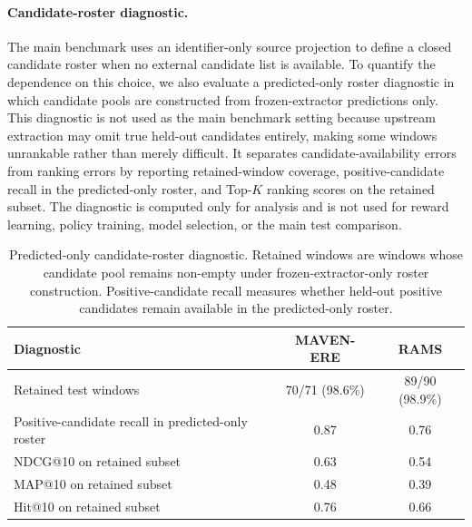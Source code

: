 \documentclass{article}
\begin{document}
\paragraph{Candidate-roster diagnostic.}
The main benchmark uses an identifier-only source projection to define a closed candidate roster when no external candidate list is available.
To quantify the dependence on this choice, we also evaluate a predicted-only roster diagnostic in which candidate pools are constructed from frozen-extractor predictions only.
This diagnostic is not used as the main benchmark setting because upstream extraction may omit true held-out candidates entirely, making some windows unrankable rather than merely difficult.
It separates candidate-availability errors from ranking errors by reporting retained-window coverage, positive-candidate recall in the predicted-only roster, and Top-$K$ ranking scores on the retained subset.
The diagnostic is computed only for analysis and is not used for reward learning, policy training, model selection, or the main test comparison.

\begin{table}[t]
\centering
\caption{Predicted-only candidate-roster diagnostic.
Retained windows are windows whose candidate pool remains non-empty under frozen-extractor-only roster construction.
Positive-candidate recall measures whether held-out positive candidates remain available in the predicted-only roster.}
\label{tab:predicted_only_roster}
\small
\setlength{\tabcolsep}{4pt}
\begin{tabularx}{\linewidth}{Ycc}
\hline
Diagnostic & MAVEN-ERE & RAMS \\
\hline
Retained test windows & 70/71 (98.6\%) & 89/90 (98.9\%) \\
Positive-candidate recall in predicted-only roster & 0.87 & 0.76 \\
NDCG@10 on retained subset & 0.63 & 0.54 \\
MAP@10 on retained subset & 0.48 & 0.39 \\
Hit@10 on retained subset & 0.76 & 0.66 \\
\hline
\end{tabularx}
\end{table}
\end{document}
